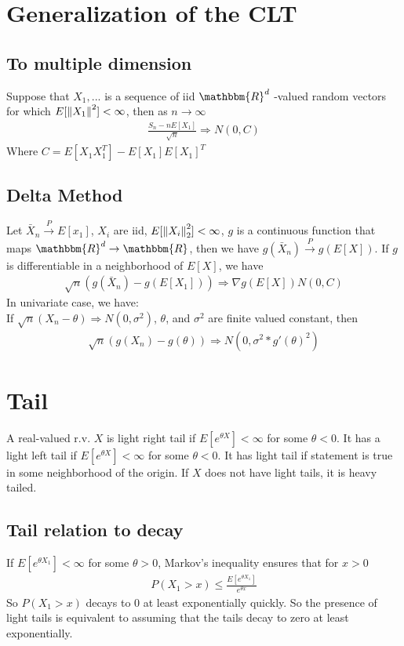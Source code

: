 \section{Generalization of the CLT} 

\subsection{To multiple dimension}
Suppose that $X_1, ...$ is a sequence of iid $\mathbbm{R}^d$ -valued random vectors for which $E[\left\lVert X_1\right\rVert^2] < \infty$, then as $n \to \infty$
    \begin{align*}
        \frac{S_n - n E[X_1]}{\sqrt{n}} \Rightarrow N(0,C)
    \end{align*}
Where $C = E[X_1X_1^T] - E[X_1]E[X_1]^T$


\subsection{Delta Method} 
Let $\bar{X}_n \overset{P}{\to} E[x_1]$, $X_i$ are iid, $E[\left\lVert X_i\right\rVert_2^2] < \infty$, $g$ is a continuous function that maps $\mathbbm{R}^d \to \mathbbm{R}$, then we have $g(\bar{X}_n) \overset{P}{\to} g(E[X])$. If $g$ is differentiable in a neighborhood of $E[X]$, we have 
    \begin{align*}
        \sqrt{n}(g(\bar{X}_n) - g(E[X_1])) \Rightarrow \nabla g(E[X]) N(0, C)
    \end{align*}
In univariate case, we have: \\
If $\sqrt{n}(X_n - \theta) \Rightarrow N(0, \sigma^2)$, $\theta$, and $\sigma^2$ are finite valued constant, then 
    \begin{align*}
        \sqrt{n}(g(X_n) - g(\theta)) \Rightarrow N(0, \sigma^2 * g'(\theta)^2)
    \end{align*}


\section{Tail}
A real-valued r.v. $X$ is light right tail if $E[e^{\theta X}] < \infty$ for some $\theta < 0$. It has a light left tail if $E[e^{\theta X}] < \infty$ for some $\theta < 0$. It has light tail if statement is true in some neighborhood of the origin. If $X$ does not have light tails, it is heavy tailed. 

\subsection{Tail relation to decay}
If $E[e^{\theta X_1}] < \infty$ for some $\theta > 0$, Markov's inequality ensures that for $x > 0$
    \begin{align*}
        P(X_1 > x) \leq \frac{E[e^{\theta X_1}]}{e^{\theta x}}
    \end{align*}
So $P(X_1 > x)$ decays to 0 at least exponentially quickly. So the presence of light tails is equivalent to assuming that the tails decay to zero at least exponentially. 
    
